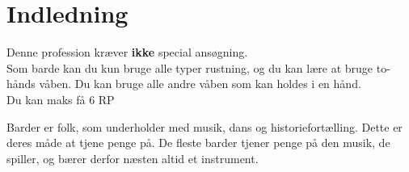 
\chapter{Indledning}

Denne profession kræver \textbf{ikke} special ansøgning.\\
Som barde kan du kun bruge alle typer rustning, og du kan lære at bruge to-hånds våben. Du kan bruge alle andre våben som kan holdes i en hånd.\\
Du kan maks få 6 RP 

Barder er folk, som underholder med musik, dans og historiefortælling. Dette er deres måde at tjene penge på. De fleste barder tjener penge på den musik, de spiller, og bærer derfor næsten altid et instrument.
